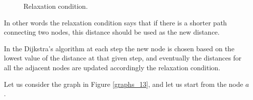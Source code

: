 \begin{figure}[H]

\centering
{}

\caption[Relaxation condition.]{Relaxation condition.}
\label{graphs_12}
\end{figure}

In other words the relaxation condition says that if there is a shorter path connecting two nodes, this distance should be used as the new distance.

In the Dijkstra's algorithm at each step the new node is chosen based on the lowest value of the distance at that given step, and eventually the distances for all the adjacent nodes are updated accordingly the relaxation condition.

Let us consider the graph in Figure \ref{graphs_13}, and let us start from the node \(a\) \cite{dijkstraexplaination}.

